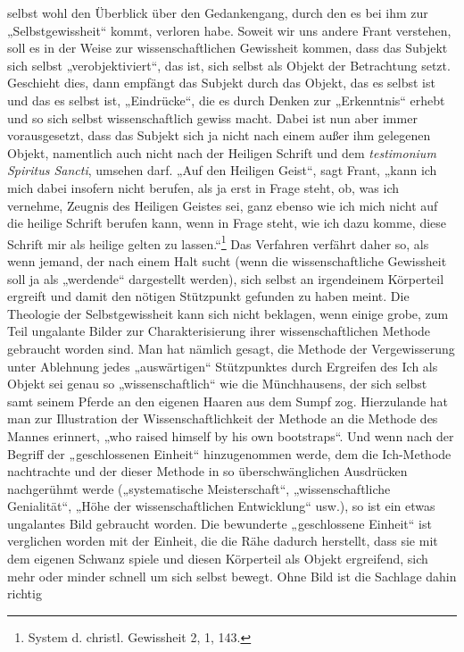 selbst wohl den Überblick über den Gedankengang, durch den es bei ihm zur „Selbstgewissheit“ kommt, verloren habe. Soweit wir uns andere Frant verstehen, soll es in der Weise zur wissenschaftlichen Gewissheit kommen, dass das Subjekt sich selbst „verobjektiviert“, das ist, sich selbst als Objekt der Betrachtung setzt. Geschieht dies, dann empfängt das Subjekt durch das Objekt, das es selbst ist und das es selbst ist, „Eindrücke“, die es durch Denken zur „Erkenntnis“ erhebt und so sich selbst wissenschaftlich gewiss macht. Dabei ist nun aber immer vorausgesetzt, dass das Subjekt sich ja nicht nach einem außer ihm gelegenen Objekt, namentlich auch nicht nach der Heiligen Schrift und dem \emph{testimonium Spiritus Sancti}, umsehen darf. „Auf den Heiligen Geist“, sagt Frant, „kann ich mich dabei insofern nicht berufen, als ja erst in Frage steht, ob, was ich vernehme, Zeugnis des Heiligen Geistes sei, ganz ebenso wie ich mich nicht auf die heilige Schrift berufen kann, wenn in Frage steht, wie ich dazu komme, diese Schrift mir als heilige gelten zu lassen.“\footnote{System d. christl. Gewissheit 2, 1, 143.} Das Verfahren verfährt daher so, als wenn jemand, der nach einem Halt sucht (wenn die wissenschaftliche Gewissheit soll ja als „werdende“ dargestellt werden), sich selbst an irgendeinem Körperteil ergreift und damit den nötigen Stützpunkt gefunden zu haben meint. Die Theologie der Selbstgewissheit kann sich nicht beklagen, wenn einige grobe, zum Teil ungalante Bilder zur Charakterisierung ihrer wissenschaftlichen Methode gebraucht worden sind. Man hat nämlich gesagt, die Methode der Vergewisserung unter Ablehnung jedes „auswärtigen“ Stützpunktes durch Ergreifen des Ich als Objekt sei genau so „wissenschaftlich“ wie die Münchhausens, der sich selbst samt seinem Pferde an den eigenen Haaren aus dem Sumpf zog. Hierzulande hat man zur Illustration der Wissenschaftlichkeit der Methode an die Methode des Mannes erinnert, „who raised himself by his own bootstraps“. Und wenn nach der Begriff der „geschlossenen Einheit“ hinzugenommen werde, dem die Ich-Methode nachtrachte und der dieser Methode in so überschwänglichen Ausdrücken nachgerühmt werde („systematische Meisterschaft“, „wissenschaftliche Genialität“, „Höhe der wissenschaftlichen Entwicklung“ usw.), so ist ein etwas ungalantes Bild gebraucht worden. Die bewunderte „geschlossene Einheit“ ist verglichen worden mit der Einheit, die die Rähe dadurch herstellt, dass sie mit dem eigenen Schwanz spiele und diesen Körperteil als Objekt ergreifend, sich mehr oder minder schnell um sich selbst bewegt. Ohne Bild ist die Sachlage dahin richtig